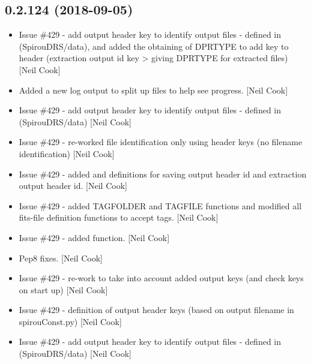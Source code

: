 \documentclass[a4paper,10pt,english]{report}
\begin{document}
\subsection{0.2.124 (2018-09-05)}
\label{\detokenize{misc/changelog:id336}}\begin{itemize}
\item {} 
Issue \#429 - add output header key to identify output files
 - defined in  (SpirouDRS/data), and added
the obtaining of DPRTYPE to add   key to header (extraction
output id key \textendash{}\textgreater{} giving DPRTYPE for extracted files) {[}Neil Cook{]}

\item {} 
Added a new log output to split up files to help see progress. {[}Neil
Cook{]}

\item {} 
Issue \#429 - add output header key to identify output files
 - defined in  (SpirouDRS/data) {[}Neil Cook{]}

\item {} 
Issue \#429 - re-worked file identification only using header keys (no
filename identification) {[}Neil Cook{]}

\item {} 
Issue \#429 - added  and  definitions for saving
output header id and extraction output header id. {[}Neil Cook{]}

\item {} 
Issue \#429 - added TAGFOLDER and TAGFILE functions and modified all
fits-file definition functions to accept tags. {[}Neil Cook{]}

\item {} 
Issue \#429 - added  function. {[}Neil Cook{]}

\item {} 
Pep8 fixes. {[}Neil Cook{]}

\item {} 
Issue \#429 - re-work  to take into account added
output keys (and check keys on start up) {[}Neil Cook{]}

\item {} 
Issue \#429 - definition of output header keys (based on output
filename in spirouConst.py) {[}Neil Cook{]}

\item {} 
Issue \#429 - add output header key to identify output files
 - defined in  (SpirouDRS/data) {[}Neil Cook{]}


\end{itemize}
\end{document}
